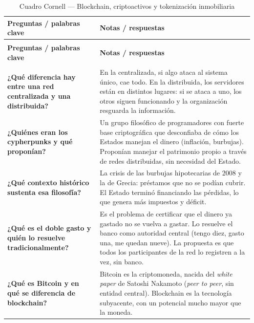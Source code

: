 \documentclass[12pt,oneside]{book}
\begin{document}
\begin{longtable}{
    >{\raggedright\arraybackslash}p{}
    >{\raggedright\arraybackslash}p{}
}
\caption{Cuadro Cornell — Blockchain, criptoactivos y tokenización inmobiliaria} \\
\toprule
\textbf{Preguntas / palabras clave} & \textbf{Notas / respuestas} \\
\midrule
\endfirsthead

\multicolumn{2}{c}{\textit{(continúa de la página anterior)}} \\
\toprule
\textbf{Preguntas / palabras clave} & \textbf{Notas / respuestas} \\
\midrule
\endhead

\midrule
\multicolumn{2}{r}{\textit{(continúa en la página siguiente)}} \\
\endfoot

\bottomrule
\endlastfoot

\textbf{¿Qué diferencia hay entre una red centralizada y una distribuida?} &
En la centralizada, si algo ataca al sistema único, cae todo. En la distribuida, los servidores están en distintos lugares: si se ataca a uno, los otros siguen funcionando y la organización resguarda la información. \\

\textbf{¿Quiénes eran los cypherpunks y qué proponían?} &
Un grupo filosófico de programadores con fuerte base criptográfica que desconfiaba de cómo los Estados manejan el dinero (inflación, burbujas). Proponían manejar el patrimonio propio a través de redes distribuidas, sin necesidad del Estado. \\

\textbf{¿Qué contexto histórico sustenta esa filosofía?} &
La crisis de las burbujas hipotecarias de 2008 y la de Grecia: préstamos que no se podían cubrir. El Estado terminó financiando las pérdidas, lo que genera más impuestos y déficit. \\

\textbf{¿Qué es el doble gasto y quién lo resuelve tradicionalmente?} &
Es el problema de certificar que el dinero ya gastado no se vuelva a gastar. Lo resuelve el banco como autoridad central (tengo diez, gasto una, me quedan nueve). La propuesta es que todos los participantes de la red lo registren a la vez, sin banco. \\

\textbf{¿Qué es Bitcoin y en qué se diferencia de blockchain?} &
Bitcoin es la criptomoneda, nacida del \textit{white paper} de Satoshi Nakamoto (\textit{peer to peer}, sin entidad central). Blockchain es la tecnología subyacente, con un potencial mucho mayor que la moneda. \\


\end{longtable}
\end{document}

